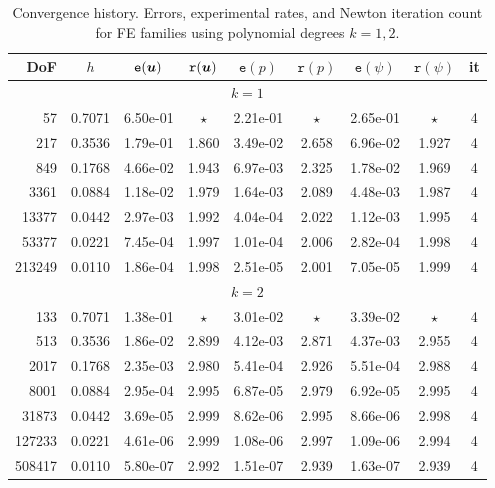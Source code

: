 \begin{table}[t!]
		\setlength{\tabcolsep}{3.5pt}
		\centering 
		{\footnotesize\begin{tabular}{|rcccccccc|}
\hline
				DoF   &   $h$  & $\texttt{e}(\boldsymbol{u})$  &   $\texttt{r}(\boldsymbol{u})$   &   $\texttt{e}(p)$  &   $\texttt{r}(p)$  &  $\texttt{e}(\psi)$  &   $\texttt{r}(\psi) $ &   it \\
				\hline 
				\multicolumn{9}{|c|}{$k=1$} \\
				\hline
				 57 & 0.7071 & 6.50e-01 & $\star$ & 2.21e-01 & $\star$ & 2.65e-01 & $\star$ &  4 \\
    217 & 0.3536 & 1.79e-01 & 1.860 & 3.49e-02 & 2.658 & 6.96e-02 & 1.927 &  4 \\
    849 & 0.1768 & 4.66e-02 & 1.943 & 6.97e-03 & 2.325 & 1.78e-02 & 1.969 &  4 \\
   3361 & 0.0884 & 1.18e-02 & 1.979 & 1.64e-03 & 2.089 & 4.48e-03 & 1.987 &  4 \\
  13377 & 0.0442 & 2.97e-03 & 1.992 & 4.04e-04 & 2.022 & 1.12e-03 & 1.995 &  4 \\
  53377 & 0.0221 & 7.45e-04 & 1.997 & 1.01e-04 & 2.006 & 2.82e-04 & 1.998 &  4 \\
 213249 & 0.0110 & 1.86e-04 & 1.998 & 2.51e-05 & 2.001 & 7.05e-05 & 1.999 &  4 \\
 \hline
				\multicolumn{9}{|c|}{$k=2$}\\
				\hline
133 & 0.7071 & 1.38e-01 & $\star$ & 3.01e-02 & $\star$ & 3.39e-02 & $\star$ &   4 \\
    513 & 0.3536 & 1.86e-02 & 2.899 & 4.12e-03 & 2.871 & 4.37e-03 & 2.955 &   4 \\
   2017 & 0.1768 & 2.35e-03 & 2.980 & 5.41e-04 & 2.926 & 5.51e-04 & 2.988 &   4 \\
   8001 & 0.0884 & 2.95e-04 & 2.995 & 6.87e-05 & 2.979 & 6.92e-05 & 2.995 &   4 \\
  31873 & 0.0442 & 3.69e-05 & 2.999 & 8.62e-06 & 2.995 & 8.66e-06 & 2.998 &   4 \\
 127233 & 0.0221 & 4.61e-06 & 2.999 & 1.08e-06 & 2.997 & 1.09e-06 & 2.994 &   4 \\
 508417 & 0.0110 & 5.80e-07 & 2.992 & 1.51e-07 & 2.939 & 1.63e-07 & 2.939 &   4 \\
 				\hline
		\end{tabular}}
		\caption{Convergence history. Errors, experimental rates, and Newton iteration count for FE families  using polynomial degrees $k=1,2$. }
		\label{table1}
	\end{table}
	

